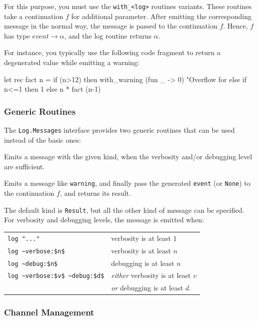 For this purpose, you must use the \texttt{with\_<log>} routines
variants. These routines take a continuation $f$ for additional
parameter. After emitting the corresponding message in the normal
way, the message is passed to the continuation $f$. Hence, $f$ has
type $\mathit{event}\rightarrow\alpha$, and the log routine returns
$\alpha$.

For instance, you typically use the following code fragment to return
a degenerated value while emitting a warning:
\begin{ocamlcode}
  let rec fact n =
    if (n>12) then
      with_warning (fun _ -> 0) "Overflow for %
    else if n<=1 then 1 else n * fact (n-1)
\end{ocamlcode}

\subsubsection{Generic Routines}

The \lstinline{Log.Messages} interface provides two generic routines
that can be used instead of the basic ones:

\begin{description}
  Emits a message with the given kind, when the verbosity and/or
  debugging level are sufficient.

  Emits a message like \texttt{warning}, and finally pass the generated
  \texttt{event} (or \texttt{None}) to the continuation $f$,
  and returns its result.
\end{description}

The default kind is \lstinline{Result}, but all the other kind of
message can be specified. For verbosity and debugging levels, the
message is emitted when:

\begin{tabular}{ll}
  \lstinline|log "..."| & verbosity is at least $1$ \\
  \lstinline|log ~verbose:$n$| & verbosity is at least $n$ \\
  \lstinline|log ~debug:$n$| & debugging is at least $n$ \\
  \lstinline|log ~verbose:$v$ ~debug:$d$|
  & \emph{either} verbosity is at least $v$ \\
  & \emph{or} debugging is at least $d$.
\end{tabular}

\subsubsection{Channel Management}

